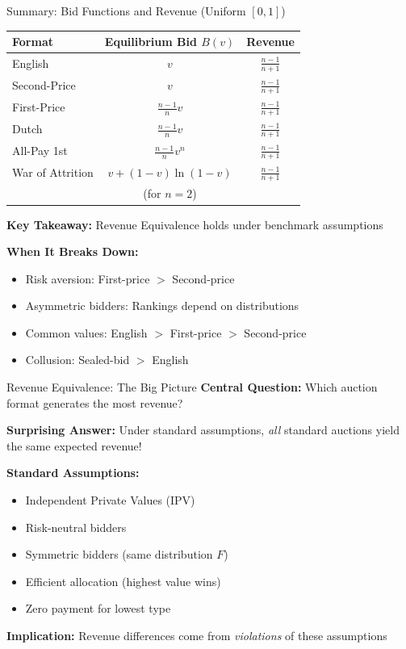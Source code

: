 \documentclass[xcolor={x11names}, aspectratio=169 ]{beamer}
\begin{document}
\begin{frame}{Summary: Bid Functions and Revenue (Uniform $[0,1]$)}
\begin{center}
\begin{tabular}{lcc}
\toprule
\textbf{Format} & \textbf{Equilibrium Bid} $B(v)$ & \textbf{Revenue} \\
\midrule
English & $v$ & $\frac{n-1}{n+1}$ \\[0.2cm]
Second-Price & $v$ & $\frac{n-1}{n+1}$ \\[0.2cm]
First-Price & $\frac{n-1}{n}v$ & $\frac{n-1}{n+1}$ \\[0.2cm]
Dutch & $\frac{n-1}{n}v$ & $\frac{n-1}{n+1}$ \\[0.2cm]
All-Pay 1st & $\frac{n-1}{n}v^n$ & $\frac{n-1}{n+1}$ \\[0.2cm]
War of Attrition & $v + (1-v)\ln(1-v)$ & $\frac{n-1}{n+1}$ \\
& (for $n=2$) & \\
\bottomrule
\end{tabular}
\end{center}

\textbf{Key Takeaway:} Revenue Equivalence holds under benchmark assumptions

\textbf{When It Breaks Down:}
\begin{itemize}
  \item Risk aversion: First-price $>$ Second-price
  \item Asymmetric bidders: Rankings depend on distributions
  \item Common values: English $>$ First-price $>$ Second-price
  \item Collusion: Sealed-bid $>$ English
\end{itemize}
\end{frame}

\begin{frame}{Revenue Equivalence: The Big Picture}
\textbf{Central Question:} Which auction format generates the most revenue?

\textbf{Surprising Answer:} Under standard assumptions, \emph{all} standard auctions yield the same expected revenue!

\textbf{Standard Assumptions:}
\begin{itemize}
  \item Independent Private Values (IPV)
  \item Risk-neutral bidders
  \item Symmetric bidders (same distribution $F$)
  \item Efficient allocation (highest value wins)
  \item Zero payment for lowest type
\end{itemize}

\textbf{Implication:} Revenue differences come from \emph{violations} of these assumptions
\end{frame}
\end{document}
